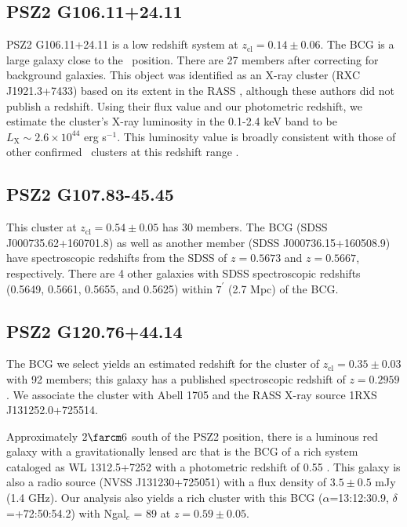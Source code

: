 \documentclass[apj, revtex4-1]{emulateapj}
\begin{document}
\subsection{PSZ2 G106.11+24.11} %
PSZ2 G106.11+24.11 is a low redshift system at $z_\mathrm{cl} = 0.14 \pm 0.06$. The BCG is a large galaxy close to the \planck\ position. There are 27 members after correcting for background galaxies. This object was identified as an X-ray cluster (RXC J1921.3+7433) based on its extent in the RASS \citep{Bohringer2000}, although these authors did not publish a redshift. Using their flux value and our photometric redshift, we estimate the cluster's X-ray luminosity in the 0.1-2.4 keV band to be $L_\mathrm{X} \sim 2.6\times 10^{44}$ erg s$^{-1}$. This luminosity value is broadly consistent with those of other confirmed \planck\ clusters at this redshift range \citep{PlanckCollaboration2015}.

\subsection{PSZ2 G107.83-45.45} %
This cluster at $z_\mathrm{cl} = 0.54 \pm 0.05$ has 30 members. The BCG (SDSS J000735.62+160701.8) as well as another member (SDSS J000736.15+160508.9) have spectroscopic redshifts from the SDSS of $z=0.5673$ and $z=0.5667$, respectively. There are 4 other galaxies with SDSS spectroscopic redshifts (0.5649, 0.5661, 0.5655, and 0.5625) within $7^\prime$ (2.7 Mpc) of the BCG.

\subsection{PSZ2 G120.76+44.14} %
The BCG we select yields an estimated redshift for the cluster of $z_\mathrm{cl} = 0.35 \pm 0.03$ with 92 members; this galaxy has a published spectroscopic redshift of $z=0.2959$ \citep{Huchra1990}. We associate the cluster with Abell 1705 and the RASS X-ray source 1RXS J131252.0+725514.

Approximately $2\farcm6$ south of the PSZ2 position, there is a luminous red galaxy with a gravitationally lensed arc that is the BCG of a rich system cataloged as WL 1312.5+7252 with a photometric redshift of 0.55 \citep{Dahle2003}. This galaxy is also a radio source (NVSS J131230+725051) with a flux density of $3.5 \pm 0.5$ mJy (1.4 GHz). Our analysis also yields a rich cluster with this BCG ($\alpha$=13:12:30.9, $\delta$=+72:50:54.2) with Ngal$_c$ = 89 at $z=0.59 \pm 0.05$.
\end{document}
